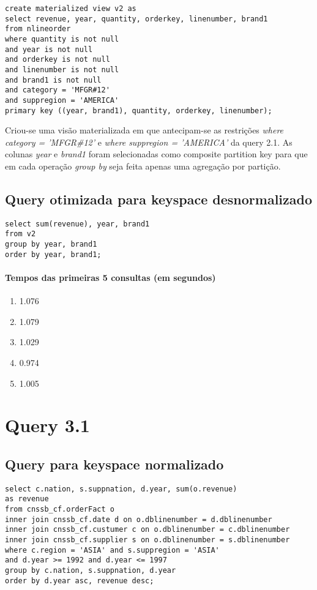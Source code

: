\documentclass[12pt]{article}
\begin{document}
\begin{lstlisting}
create materialized view v2 as 
select revenue, year, quantity, orderkey, linenumber, brand1
from nlineorder
where quantity is not null
and year is not null
and orderkey is not null
and linenumber is not null
and brand1 is not null
and category = 'MFGR#12'
and suppregion = 'AMERICA'
primary key ((year, brand1), quantity, orderkey, linenumber);
\end{lstlisting}

Criou-se uma visão materializada em que antecipam-se as restrições \emph{where category = 'MFGR\#12'} e \emph{where suppregion = 'AMERICA'} da query 2.1. As colunas \emph{year} e \emph{brand1} foram selecionadas como composite partition key para que em cada operação \emph{group by} seja feita apenas uma agregação por partição.

\subsection{Query otimizada para keyspace desnormalizado}

\begin{lstlisting}
select sum(revenue), year, brand1
from v2
group by year, brand1
order by year, brand1;
\end{lstlisting}

\paragraph{Tempos das primeiras 5 consultas (em segundos)}
\begin{enumerate}
\item 1.076
\item 1.079
\item 1.029 
\item 0.974
\item 1.005
\end{enumerate}

\section{Query 3.1}

\subsection{Query para keyspace normalizado}

\begin{lstlisting}
select c.nation, s.suppnation, d.year, sum(o.revenue)
as revenue 
from cnssb_cf.orderFact o
inner join cnssb_cf.date d on o.dblinenumber = d.dblinenumber
inner join cnssb_cf.custumer c on o.dblinenumber = c.dblinenumber 
inner join cnssb_cf.supplier s on o.dblinenumber = s.dblinenumber
where c.region = 'ASIA' and s.suppregion = 'ASIA'
and d.year >= 1992 and d.year <= 1997
group by c.nation, s.suppnation, d.year
order by d.year asc, revenue desc; 
\end{lstlisting}
\end{document}
